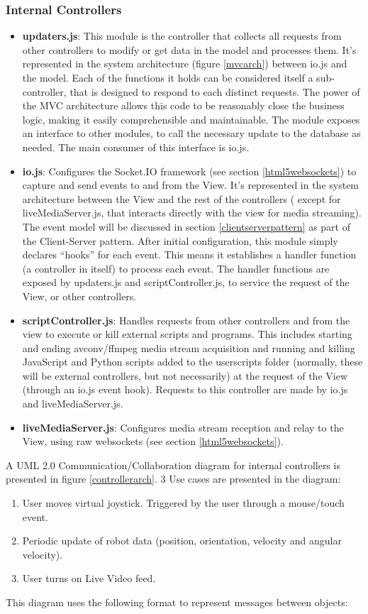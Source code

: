 \subsubsection{Internal Controllers}
\begin{itemize}
	\item \textbf{updaters.js}: This module is the controller that collects all requests from other controllers to modify 
	or get data in the model and processes them. It's represented in the system architecture (figure \ref{mvcarch}) between 
	io.js and the model. Each of the functions it holds can be considered itself a sub-controller, that is designed to 
	respond to each distinct requests. The power of the MVC architecture allows this code to be reasonably close the 
	business logic, making it easily comprehensible and maintainable. The module exposes an interface to other modules, to 
	call the necessary update to the database as needed. The main consumer of this interface is io.js.	
	\item \textbf{io.js}: Configures the Socket.IO framework (see section \ref{html5websockets}) to capture and send events 
	to and from the View. It's represented in the system architecture between the View and the rest of the controllers (
	except for liveMediaServer.js, that interacts directly with the view for media streaming). The event model will be 
	discussed in section \ref{clientserverpattern} as part of the Client-Server pattern. After initial configuration, this 
	module simply declares ``hooks'' for each event. This means it establishes a handler function (a controller in itself) 
	to process each event. The handler functions are exposed by updaters.js and scriptController.js, to service the request 
	of the View, or other controllers.
	\item \textbf{scriptController.js}: Handles requests from other controllers and from the view to execute or kill 
	external scripts and programs. This includes starting and ending avconv/ffmpeg media stream acquisition and running and 
	killing JavaScript and Python scripts added to the userscripts folder (normally, these will be external controllers, 
	but not necessarily) at the request of the View (through an io.js event hook). Requests to this controller are made by 
	io.js and liveMediaServer.js.
	\item \textbf{liveMediaServer.js}: Configures media stream reception and relay to the View, using raw websockets (see 
	section \ref{html5websockets}).
\end{itemize}
A UML 2.0 Communication/Collaboration diagram for internal controllers is presented in figure \ref{controllerarch}. 3 Use 
cases are presented in the diagram:
\begin{enumerate}
	\item User moves virtual joystick. Triggered by the user through a mouse/touch event.
	\item Periodic update of robot data (position, orientation, velocity and angular velocity).
	\item User turns on Live Video feed.
\end{enumerate}
This diagram uses the following format to represent messages between objects:\\

